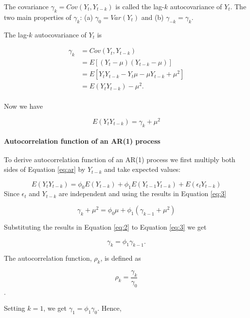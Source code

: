 \documentclass[]{book}
\let\oldparagraph\paragraph
\renewcommand{\paragraph}[1]{\oldparagraph{#1}\mbox{}}
\begin{document}
The covariance \(\gamma_k=Cov(Y_t, Y_{t-k})\) is called the lag-\(k\) autocovariance of \(Y_t\). The two main properties of \(\gamma_k\): (a) \(\gamma_0=Var(Y_t)\) and (b) \(\gamma_{-k}=\gamma_{k}\).

The lag-\(k\) autocovariance of \(Y_t\) is

\begin{equation}
  \label{eq:3}
\begin{aligned}
  \gamma_k &= Cov(Y_t, Y_{t-k}) \\
         &= E[(Y_t-\mu)(Y_{t-k}-\mu)] \\
         &= E[Y_tY_{t-k}-Y_t\mu-\mu Y_{t-k} +\mu^2] \\
         &= E(Y_t Y_{t-k}) - \mu^2. \\
\end{aligned}
\end{equation}

Now we have

\begin{equation}
  \label{eq:3}
  E(Y_t Y_{t-k}) = \gamma_k + \mu^2
\end{equation}

\hypertarget{autocorrelation-function-of-an-ar1-process}{%
\paragraph{Autocorrelation function of an AR(1) process}\label{autocorrelation-function-of-an-ar1-process}}

To derive autocorrelation function of an AR(1) process we first multiply both sides of Equation \eqref{eq:ar} by \(Y_{t-k}\) and take expected values:

\[E(Y_tY_{t-k})=\phi_0E(Y_{t-k})+\phi_1 E(Y_{t-1}Y_{t-k})+E(\epsilon_tY_{t-k})\]
Since \(\epsilon_t\) and \(Y_{t-k}\) are independent and using the results in Equation \eqref{eq:3}

\[\gamma_k + \mu^2 = \phi_0 \mu+\phi_1(\gamma_{k-1}+\mu^2)\]

Substituting the results in Equation \eqref{eq:2} to Equation \eqref{eq:3} we get

\begin{equation}
\label{eq:5}
\gamma_k = \phi_1 \gamma_{k-1}.
\end{equation}

The autocorrelation function, \(\rho_k\), is defined as

\[\rho_k = \frac{\gamma_k}{\gamma_0}\].

Setting \(k=1\), we get \(\gamma_1 = \phi_1\gamma_0.\) Hence,
\end{document}
